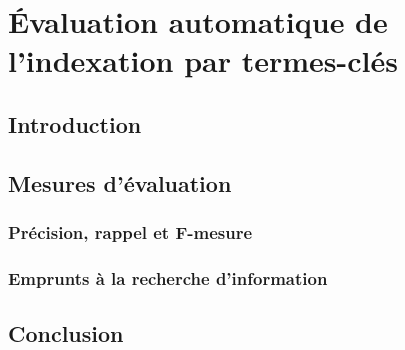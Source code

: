     \chapter{Évaluation automatique de l'indexation par termes-clés }
  \label{chap:main-state_of_the_art-automatic_evaluation_of_keyphrase_annotation}
    \section{Introduction}
    \label{sec:main-state_of_the_art-automatic_evaluation_of_keyphrase_annotation-introduction}

    \section{Mesures d'évaluation}
    \label{sec:main-state_of_the_art-automatic_evaluation_of_keyphrase_annotation-evaluation_measures}
      \subsection{Précision, rappel et F-mesure}
      \label{subsec:main-state_of_the_art-automatic_evaluation_of_keyphrase_annotation-evaluation-evaluation_measures-precision_recall_and_f_measure}

      \subsection{Emprunts à la recherche d'information}
      \label{subsec:main-state_of_the_art-automatic_evaluation_of_keyphrase_annotation-evaluation-evaluation_measures-information_retrieval_measures}

    \section{Conclusion}
    \label{sec:main-state_of_the_art-automatic_evaluation_of_keyphrase_annotation-conclusion}

